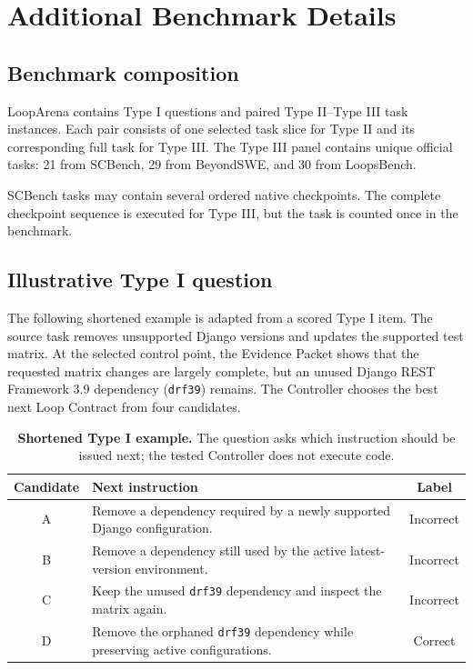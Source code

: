 \raggedbottom

\section{Additional Benchmark Details}
\label{app:benchmark-details}

\subsection{Benchmark composition}

LoopArena contains \NumTypeI{} Type I questions and \NumTypeII{} paired Type II--Type III task instances. Each pair consists of one selected task slice for Type II and its corresponding full task for Type III. The Type III panel contains \NumTypeIII{} unique official tasks: 21 from SCBench, 29 from BeyondSWE, and 30 from LoopsBench.

SCBench tasks may contain several ordered native checkpoints. The complete checkpoint sequence is executed for Type III, but the task is counted once in the benchmark.

\subsection{Illustrative Type I question}

The following shortened example is adapted from a scored Type I item. The source task removes unsupported Django versions and updates the supported test matrix. At the selected control point, the Evidence Packet shows that the requested matrix changes are largely complete, but an unused Django REST Framework 3.9 dependency (\texttt{drf39}) remains. The Controller chooses the best next Loop Contract from four candidates.

\begin{table}[H]
\caption{\textbf{Shortened Type I example.} The question asks which instruction should be issued next; the tested Controller does not execute code.}
\label{tab:type-i-example}
\centering
\small
\begin{tabularx}{\linewidth}{@{}c>{\raggedright\arraybackslash}Xc@{}}
\toprule
Candidate & Next instruction & Label \\
\midrule
A & Remove a dependency required by a newly supported Django configuration. & Incorrect \\
B & Remove a dependency still used by the active latest-version environment. & Incorrect \\
C & Keep the unused \texttt{drf39} dependency and inspect the matrix again. & Incorrect \\
D & Remove the orphaned \texttt{drf39} dependency while preserving active configurations. & Correct \\
\bottomrule
\end{tabularx}
\end{table}

